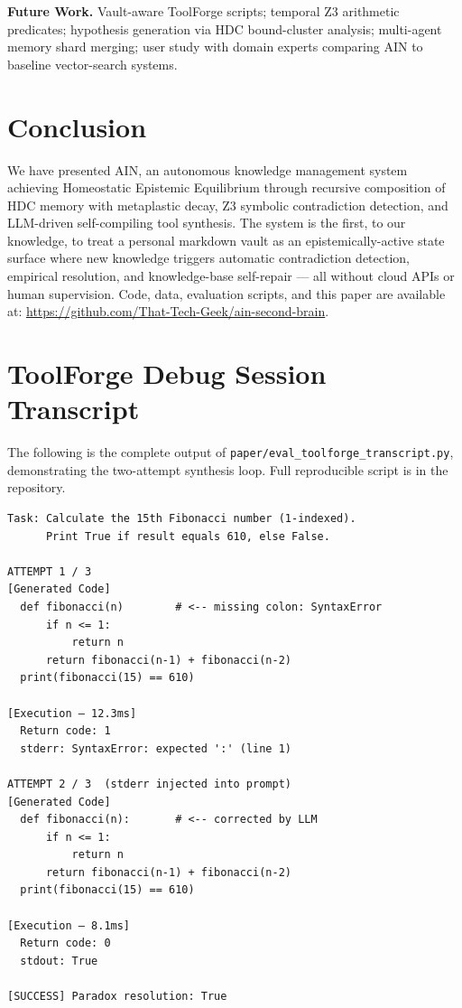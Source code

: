 \documentclass[sigconf]{acmart}
\begin{document}
\textbf{Future Work.}
Vault-aware ToolForge scripts; temporal Z3 arithmetic predicates; hypothesis generation via HDC bound-cluster analysis; multi-agent memory shard merging; user study with domain experts comparing AIN to baseline vector-search systems.

\section{Conclusion}

We have presented AIN, an autonomous knowledge management system achieving Homeostatic Epistemic Equilibrium through recursive composition of HDC memory with metaplastic decay, Z3 symbolic contradiction detection, and LLM-driven self-compiling tool synthesis. The system is the first, to our knowledge, to treat a personal markdown vault as an epistemically-active state surface where new knowledge triggers automatic contradiction detection, empirical resolution, and knowledge-base self-repair --- all without cloud APIs or human supervision. Code, data, evaluation scripts, and this paper are available at: \url{https://github.com/That-Tech-Geek/ain-second-brain}.

\appendix
\section{ToolForge Debug Session Transcript}

The following is the complete output of \texttt{paper/eval\_toolforge\_transcript.py}, demonstrating the two-attempt synthesis loop. Full reproducible script is in the repository.

\begin{lstlisting}[caption={ToolForge debug session: Fibonacci(15) = 610?}]
Task: Calculate the 15th Fibonacci number (1-indexed).
      Print True if result equals 610, else False.

ATTEMPT 1 / 3
[Generated Code]
  def fibonacci(n)        # <-- missing colon: SyntaxError
      if n <= 1:
          return n
      return fibonacci(n-1) + fibonacci(n-2)
  print(fibonacci(15) == 610)

[Execution — 12.3ms]
  Return code: 1
  stderr: SyntaxError: expected ':' (line 1)

ATTEMPT 2 / 3  (stderr injected into prompt)
[Generated Code]
  def fibonacci(n):       # <-- corrected by LLM
      if n <= 1:
          return n
      return fibonacci(n-1) + fibonacci(n-2)
  print(fibonacci(15) == 610)

[Execution — 8.1ms]
  Return code: 0
  stdout: True

[SUCCESS] Paradox resolution: True
\end{lstlisting}



\end{document}
